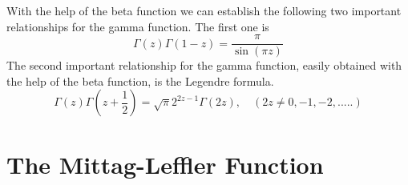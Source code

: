 \documentclass[a4paper,14pt,oneside]{book}
\theoremstyle{plain}
\theoremstyle{definition}
\theoremstyle{remark}
\begin{document}
\begin{center}
\begin{flushleft}
{With the help of the beta function we can establish the following two important relationships for the gamma function.
The first one is
\begin{equation}\label{eq:16}
\Gamma(z) \Gamma(1-z)=\frac{\pi}{\sin (\pi z)}
\end{equation}
The second important relationship for the gamma function, easily obtained with the help of the beta function, is the Legendre formula. 
\begin{equation}\label{eq:17}
\Gamma(z)\Gamma(z + \frac{1}{2})=\sqrt\pi2^{2z-1}\Gamma(2z), \quad(2z \neq 0, -1, -2, .....)
\end{equation}}
\end{flushleft}        
\end{center}

\section{The Mittag-Leffler Function}
\justify
\end{document}
